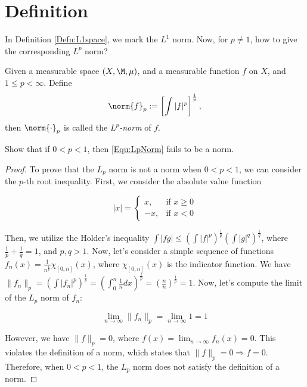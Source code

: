\section{Definition}
\begin{rem}
    In Definition \ref{Defn:L1space}, we mark the 
    $L^{1}$ norm. Now, for $p\neq 1$, how to give the 
    corresponding $L^{p}$ norm?
\end{rem}
\begin{defn}
    Given a measurable space $(X,\M,\mu)$, and a 
    measurable function $f$ on $X$, and $1\le p<\infty$. 
    Define 
    \begin{equation}
        \label{Equ:LpNorm}
        \norm{f}_{p}:=\left[\int|f|^{p}\right]^{\frac{1}{p}}, 
    \end{equation}
    then $\norm{\cdot}_{p}$ is called the 
    \textit{$L^{p}$-norm} of $f$.
\end{defn}
\begin{exc}
    Show that if $0<p<1$, then \eqref{Equ:LpNorm} fails to be  
    a norm.
\end{exc}
\begin{proof}
    To prove that the $L_p$ norm is not a norm when 
    $0 < p < 1$, we can consider the $p$-th root inequality.
    First, we consider the absolute value function 
    
    $$
    |x| = \begin{cases} x, & \text{if } x \geq 0 \\ -x, 
    & \text{if } x < 0 \end{cases}
    $$

    Then, we utilize the Holder's inequality 
    $\int |fg| \leq (\int |f|^p)^{\frac{1}{p}} 
    (\int |g|^q)^{\frac{1}{q}}$, where $\frac{1}{p} + 
    \frac{1}{q} = 1$, and $p, q > 1$.
    Now, let's consider a simple sequence of functions 
    $f_n(x) = \frac{1}{n^{\frac{1}{p}}} \chi_{[0, n]}(x)$, 
    where $\chi_{[0, n]}(x)$ is the indicator function.
    We have $\|f_n\|_p = \left(\int |f_n|^p\right)^{\frac{1}{p}}
    = \left(\int_0^n \frac{1}{n} dx\right)^{\frac{1}{p}} 
    = \left(\frac{n}{n}\right)^{\frac{1}{p}} = 1$.
    Now, let's compute the limit of the $L_p$ norm of $f_n$:

    $$
    \lim_{n \to \infty} \|f_n\|_p = \lim_{n \to \infty} 1 = 1
    $$

    However, we have $\|f\|_p = 0$, where $f(x) 
    = \lim_{n \to \infty} f_n(x) = 0$. This violates 
    the definition of a norm, which states that 
    $\|f\|_p = 0 \Rightarrow f = 0$.
    Therefore, when $0 < p < 1$, the $L_p$ norm does not 
    satisfy the definition of a norm.
\end{proof}
